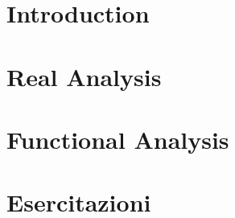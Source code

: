 \documentclass[10pt,a4paper,twoside]{book}
\numberwithin{figure}{chapter}
\numberwithin{equation}{chapter}
\begin{document}

\pagestyle{fancy}
\mainmatter

\part{Introduction}
 \cleardoublepage
 \cleardoublepage

\part{Real Analysis}
 \cleardoublepage
 \cleardoublepage
 \cleardoublepage
 \cleardoublepage
 \cleardoublepage
 \cleardoublepage
 \cleardoublepage
 \cleardoublepage
 \cleardoublepage

\part{Functional Analysis}
 \cleardoublepage
 \cleardoublepage
 \cleardoublepage
 \cleardoublepage
 \cleardoublepage
 \cleardoublepage
 \cleardoublepage
 \cleardoublepage

\part{Esercitazioni}
 \cleardoublepage
 \cleardoublepage
 \cleardoublepage
 \cleardoublepage
 \cleardoublepage
 \cleardoublepage
 \cleardoublepage
 \cleardoublepage
 \cleardoublepage
 \cleardoublepage
\end{document}
